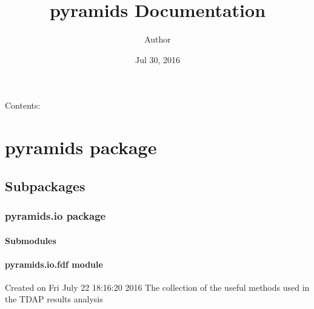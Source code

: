 \documentclass[letterpaper,10pt,english]{sphinxmanual}
\title{pyramids Documentation}
\date{Jul 30, 2016}
\author{Author}
\begin{document}
\maketitle
\tableofcontents
{}\label{index::doc}


Contents:


\chapter{pyramids package}
\label{pyramids:pyramids-package}\label{pyramids::doc}\label{pyramids:welcome-to-pyramids-s-documentation}

\section{Subpackages}
\label{pyramids:subpackages}

\subsection{pyramids.io package}
\label{pyramids.io:pyramids-io-package}\label{pyramids.io::doc}

\subsubsection{Submodules}
\label{pyramids.io:submodules}

\subsubsection{pyramids.io.fdf module}
\label{pyramids.io:module-pyramids.io.fdf}\label{pyramids.io:pyramids-io-fdf-module}
Created on Fri July 22 18:16:20 2016
The collection of the useful methods used in the TDAP results analysis
\end{document}
